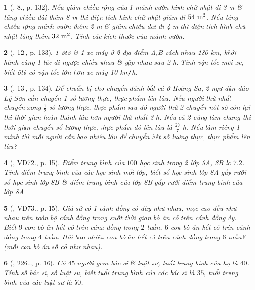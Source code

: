 \documentclass{article}
\newtheorem{baitoan}{}
\begin{document}
\begin{baitoan}[\cite{Kien_dai_so_9}, 8., p. 132]
	Nếu giảm chiều rộng của 1 mảnh vườn hình chữ nhật đi {\rm3 m} \& tăng chiều dài thêm {\rm8 m} thì diện tích hình chữ nhật giảm đi $\rm54\ m^2$. Nếu tăng chiều rộng mảnh vườn thêm {\rm2 m} \& giảm chiều dài đi {\rm4 m} thì diện tích hình chữ nhật tăng thêm $\rm32\ m^2$. Tính các kích thước của mảnh vườn.
\end{baitoan}

\begin{baitoan}[\cite{Kien_dai_so_9}, 12., p. 133]
	1 ôtô \& 1 xe máy ở 2 địa điểm A,B cách nhau {\rm180 km}, khởi hành cùng 1 lúc đi ngược chiều nhau \& gặp nhau sau {\rm2 h}. Tính vận tốc mỗi xe, biết ôtô có vận tốc lớn hơn xe máy {\rm10 km{\tt/}h}.
\end{baitoan}

\begin{baitoan}[\cite{Kien_dai_so_9}, 13., p. 134]
	Để chuẩn bị cho chuyến đánh bắt cá ở Hoàng Sa, 2 ngư dân đảo Lý Sơn cần chuyển 1 số lương thực, thực phẩm lên tàu. Nếu người thứ nhất chuyển xong $\frac{1}{2}$ số lương thực, thực phẩm sau đó người thứ 2 chuyển nốt số còn lại thì thời gian hoàn thành lâu hơn người thứ nhất {\rm3 h}. Nếu cả 2 cùng làm chung thì thời gian chuyển số lương thực, thực phẩm đó lên tàu là $\frac{20}{7}$ {\rm h}. Nếu làm riêng 1 mình thì mỗi người cần bao nhiêu lâu để chuyển hết số lương thực, thực phẩm lên tàu?
\end{baitoan}

\begin{baitoan}[\cite{Binh_Toan_9_tap_2}, VD72., p. 15]
	Điểm trung bình của $100$ học sinh trong 2 lớp 8A, 8B là $7.2$. Tính điểm trung bình của các học sinh mỗi lớp, biết số học sinh lớp 8A gấp rưỡi số học sinh lớp 8B \& điểm trung bình của lớp 8B gấp rưỡi điểm trung bình của lớp 8A.
\end{baitoan}

\begin{baitoan}[\cite{Binh_Toan_9_tap_2}, VD73., p. 15]
	Giả sử có 1 cánh đồng cỏ dày như nhau, mọc cao đều như nhau trên toàn bộ cánh đồng trong suốt thời gian bò ăn cỏ trên cánh đồng ấy. Biết $9$ con bò ăn hết cỏ trên cánh đồng trong $2$ tuần, $6$ con bò ăn hết cỏ trên cánh đồng trong $4$ tuần. Hỏi bao nhiêu con bò ăn hết cỏ trên cánh đồng trong $6$ tuần? (mỗi con bò ăn số cỏ như nhau).
\end{baitoan}

\begin{baitoan}[\cite{Binh_Toan_9_tap_2}, 226.., p. 16]
	Có $45$ người gồm bác sĩ \& luật sư, tuổi trung bình của họ là $40$. Tính số bác sĩ, số luật sư, biết tuổi trung bình của các bác sĩ là $35$, tuổi trung bình của các luật sư là $50$.
\end{baitoan}
\end{document}
